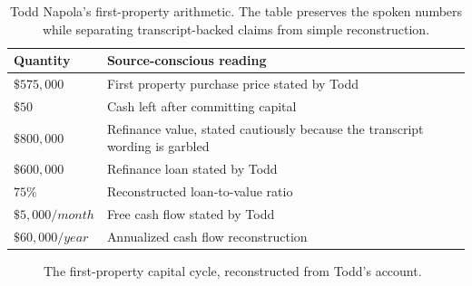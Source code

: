 \documentclass[11pt,oneside]{book}
\begin{document}
\begin{table}
\centering
\begin{tabular}{|p{.43\linewidth}|p{.43\linewidth}|}
\hline
Quantity & Source-conscious reading\\
\hline
\(\$575{,}000\) & First property purchase price stated by Todd\\
\hline
\(\$50\) & Cash left after committing capital\\
\hline
\(\$800{,}000\) & Refinance value, stated cautiously because the transcript wording is garbled\\
\hline
\(\$600{,}000\) & Refinance loan stated by Todd\\
\hline
\(75\%\) & Reconstructed loan-to-value ratio\\
\hline
\(\$5{,}000/month\) & Free cash flow stated by Todd\\
\hline
\(\$60{,}000/year\) & Annualized cash flow reconstruction\\
\hline
\end{tabular}
\caption{Todd Napola's first-property arithmetic. The table preserves the spoken numbers while separating transcript-backed claims from simple reconstruction.}
\end{table}

\begin{figure}
\centering
{}
\caption{The first-property capital cycle, reconstructed from Todd's account.}
\end{figure}
\end{document}
